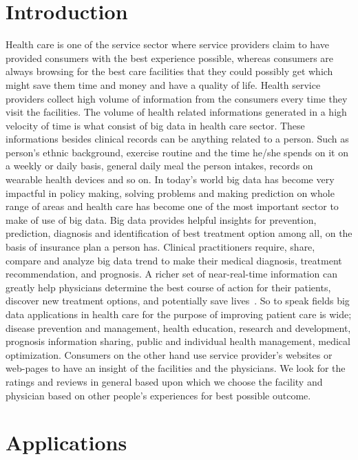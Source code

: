 \documentclass[sigconf]{acmart}
\begin{document}
\section{Introduction}
Health care is one of the service sector where service providers claim to have provided consumers with the best experience possible, whereas consumers are always browsing for the best care facilities that they could possibly get which might save them time and money and have a quality of life. Health service providers collect high volume of information from the consumers every time they visit the facilities. The volume of health related informations generated in a high velocity of time is what consist of big data in health care sector.
These informations besides clinical records can be anything related to a person. Such as  person's ethnic background, exercise routine
and the time he/she spends on it on a weekly or daily basis, general daily meal the person intakes, records on wearable health devices 
and so on. In today's world big data has become very impactful in policy making, solving problems and making prediction on whole range 
of areas and health care has become one of the most important sector to make of use of big data. Big data provides helpful insights 
for prevention, prediction, diagnosis and identification of best treatment option among all, on the basis of insurance plan a person 
has. Clinical practitioners require, share, compare and analyze big data trend to make their medical diagnosis, treatment
recommendation, and prognosis. A richer set of near-real-time information can greatly help
physicians determine the best course of action for their patients, discover new treatment
options, and potentially save lives~\cite{www-hpe}. So to speak fields big data applications in health care for the purpose of 
improving patient care is wide; disease prevention and management, health education, research and development, prognosis  
information sharing, public and individual health management, medical optimization.
Consumers on the other hand use service provider's websites or web-pages to have an insight of the facilities and the physicians.
We look for the ratings and reviews in general based upon which we choose the facility and physician based on other people's experiences for best possible outcome.


\section{Applications}
\end{document}
